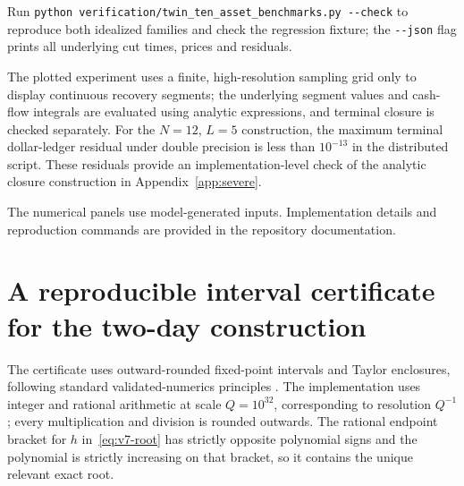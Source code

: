 \documentclass[review,hidelinks,onefignum,onetabnum]{siamonline250211}
\begin{document}
Run \texttt{python verification/twin\_ten\_asset\_benchmarks.py -{}-check}
to reproduce both idealized families and check the
regression fixture; the \texttt{-{}-json} flag prints
all underlying cut times, prices and residuals.

The plotted experiment uses a finite, high-resolution sampling grid only to display continuous recovery segments; the underlying segment values and cash-flow integrals are evaluated using analytic expressions, and terminal closure is checked separately. For the $N=12$, $L=5$ construction, the maximum terminal dollar-ledger residual under double precision is less than $10^{-13}$ in the distributed script. These residuals provide an implementation-level check of the analytic closure construction in Appendix~\ref{app:severe}.

The numerical panels use model-generated inputs. Implementation details and reproduction commands are provided in the repository documentation.


\section{A reproducible interval certificate for the two-day construction}\label{app:v7certificate}
The certificate uses outward-rounded fixed-point intervals and Taylor enclosures, following standard validated-numerics principles \citep{Tucker2011}. The implementation  uses integer and rational arithmetic at scale $Q=10^{32}$, corresponding to resolution $Q^{-1}$; every multiplication and division is rounded outwards. The rational endpoint bracket for $h$ in~\eqref{eq:v7-root} has strictly opposite polynomial signs and the polynomial is strictly increasing on that bracket, so it contains the unique relevant exact root.
\end{document}
